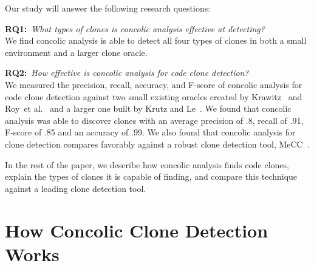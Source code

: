 \documentclass{sig-alternate}
\newif\ifisnopii
\begin{document}
Our study will answer the following research questions:

\textbf{RQ1:}~\emph{What types of clones is concolic analysis effective at detecting?}\\
We find concolic analysis is able to detect all four types of clones in both a small environment and a larger clone oracle.

\textbf{RQ2:}~\emph{How effective is concolic analysis for code clone detection?}\\
We measured the precision, recall, accuracy, and F-score of concolic analysis for code clone detection against two small existing oracles created by Krawitz~\cite{Kraw2012} and Roy~et al.~\cite{Roy:2009:CEC:1530898.1531101} and a larger one built by Krutz and Le~\cite{Krutz:2014:CCO:2597073.2597127}. We found that concolic analysis was able to discover clones with an average precision of .8, recall of .91, F-score of .85 and an accuracy of .99. We also found that concolic analysis for clone detection compares favorably against a robust clone detection tool, MeCC~\cite{Kim:2011:MMC:1985793.1985835}. 

In the rest of the paper, we describe how concolic analysis finds code clones, explain the types of clones it is capable of finding, and compare this technique against a leading clone detection tool.




\vspace{-0.08in}
\section{How Concolic Clone Detection Works}
\label{sec: howconcolicworks}


\end{document}

